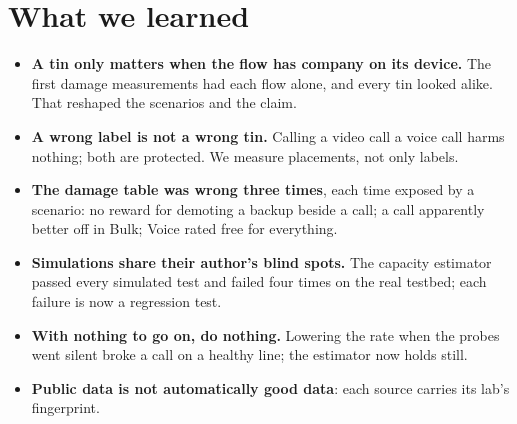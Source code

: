 \documentclass[11pt,a4paper]{article}
\newif\ifnewpage\newpagetrue
\newcommand{\samepagenext}{\global\newpagefalse}
\begin{document}
\section{What we learned}
\begin{itemize}
\item \textbf{A tin only matters when the flow has company on its device.} The first damage measurements had each flow alone, and every tin looked alike. That reshaped the scenarios and the claim.
\item \textbf{A wrong label is not a wrong tin.} Calling a video call a voice call harms nothing; both are protected. We measure placements, not only labels.
\item \textbf{The damage table was wrong three times}, each time exposed by a scenario: no reward for demoting a backup beside a call; a call apparently better off in Bulk; Voice rated free for everything.
\item \textbf{Simulations share their author's blind spots.} The capacity estimator passed every simulated test and failed four times on the real testbed; each failure is now a regression test.
\item \textbf{With nothing to go on, do nothing.} Lowering the rate when the probes went silent broke a call on a healthy line; the estimator now holds still.
\item \textbf{Public data is not automatically good data}: each source carries its lab's fingerprint.
\end{itemize}

\samepagenext
\end{document}
